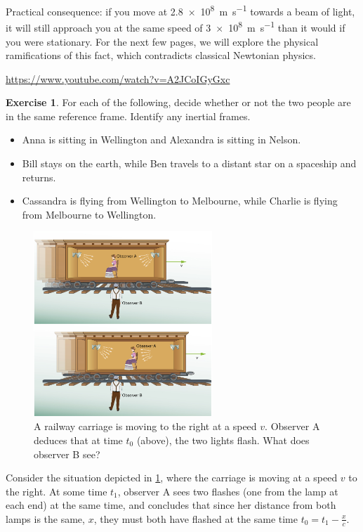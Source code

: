 \documentclass[a4paper]{amsbook}
\newcommand{\marginsymbol}{}
\newcommand{\goandwatch}[1]{
\begin{center}
\begin{tcolorbox}[width=0.8\textwidth,colback={SkyBlue!20},title={\textbf{Go and watch...}},colbacktitle=MidnightBlue,coltitle=White]
  \textcolor{MidnightBlue}{\url{#1}}
\end{tcolorbox}
\end{center}}
\theoremstyle{definition}
\newtheorem{exercise}{Exercise}
\numberwithin{exercise}{chapter}
\numberwithin{exercise}{chapter}
\begin{document}
Practical consequence: if you move at \SI{2.8e8}{\metre\per\second} towards a beam of light, it will still approach you at the same
speed of \SI{3e8}{\metre\per\second} than it would if you were stationary. For the next few pages, we will explore the physical
ramifications of this fact, which contradicts classical Newtonian physics.

\goandwatch{https://www.youtube.com/watch?v=A2JCoIGyGxc}

\begin{exercise}
  For each of the following, decide whether or not the two people are in the same reference frame. Identify any inertial frames.
  \begin{itemize}
    \item Anna is sitting in Wellington and Alexandra is sitting in Nelson.
    \item Bill stays on the earth, while Ben travels to a distant star on a spaceship and returns.
    \item Cassandra is flying from Wellington to Melbourne, while Charlie is flying from Melbourne to Wellington.
  \end{itemize}
\end{exercise}

\begin{figure}
  \centering
  \includegraphics[width=0.6\textwidth]{simultaneous}
  \caption{A railway carriage is moving to the right at a speed $ v $. Observer A deduces that at time $ t_0 $ (above), the
           two lights flash. What does observer B see? \label{fig:simultaneous}}
\end{figure}

\marginsymbol Consider the situation depicted in \cref{fig:simultaneous}, where the carriage is moving at a speed $ v $ to the
right. At some time $ t_1 $, observer A sees two flashes (one from the lamp at each end) at the same time, and concludes that
since her distance from both lamps is the same, $ x $, they must both have flashed at the same time $ t_0 = t_1 - \frac{x}{c} $.
\end{document}

